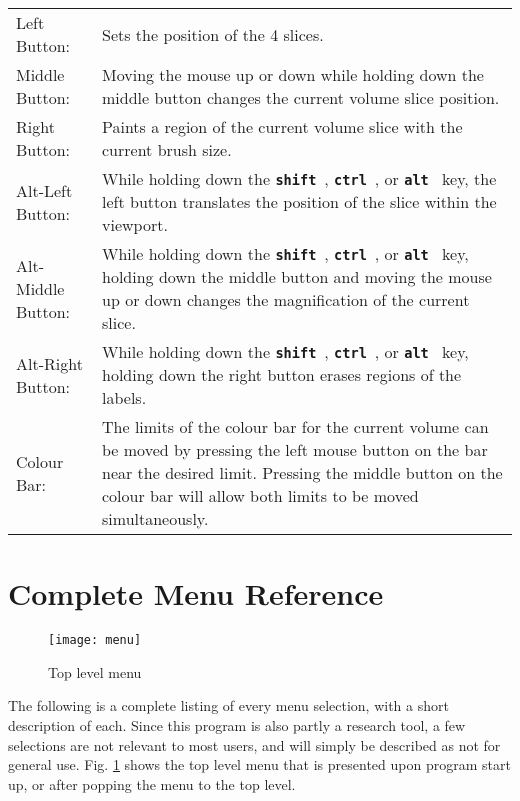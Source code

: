 \documentclass{article}
\newcommand{\ident}[1]{{\bf\tt #1}\ }
\begin{document}
\begin{tabular}[t]{p{3cm}p{7cm}}
Left Button:  &  Sets the position of the 4 slices. \\
Middle Button:  &  Moving the mouse up or down while holding down the
                   middle button changes the current volume
                   slice position. \\
Right Button:  &  Paints a region of the current volume slice with the
                     current brush size. \\
Alt-Left Button:  &  While holding down the \ident{shift}, \ident{ctrl},
                        or \ident{alt} key, the left button translates the
                        position of the slice within the viewport. \\
Alt-Middle Button:  &  While holding down the \ident{shift}, \ident{ctrl},
                        or \ident{alt} key, holding down the middle button
                        and moving the mouse up or down changes the
                        magnification of the current slice. \\
Alt-Right Button:  &  While holding down the \ident{shift}, \ident{ctrl},
                        or \ident{alt} key, holding down the right button
                        erases regions of the labels. \\
Colour Bar:  &  The limits of the colour bar for the current volume
                   can be moved by pressing
                   the left mouse button on the bar near the desired limit.
                   Pressing the middle button on the colour bar will allow
                   both limits to be moved simultaneously.
\end{tabular}

\section{Complete Menu Reference}

\begin{figure}
\texttt{[image: menu]}
\caption{Top level menu}
\label{menu}
\end{figure}

The following is a complete listing of every menu selection, with a
short description of each.
Since this program is also partly a research tool, a few selections are
not relevant to most users, and will simply be described as not for general
use.  Fig. \ref{menu} shows the top level menu that is presented upon
program start up, or after popping the menu to the top level.
\end{document}
